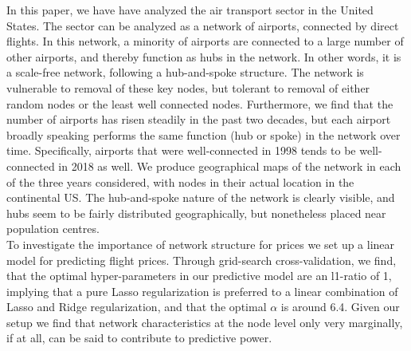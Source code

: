 \label{sec:conclusion}
In this paper, we have have analyzed the air transport sector in the United States. The sector can be analyzed as a network of airports, connected by direct flights. In this network, a minority of airports are connected to a large number of other airports, and thereby function as hubs in the network. In other words, it is a scale-free network, following a hub-and-spoke structure. The network is vulnerable to removal of these key nodes, but tolerant to removal of either random nodes or the least well connected nodes. Furthermore, we find that the number of airports has risen steadily in the past two decades, but each airport broadly speaking performs the same function (hub or spoke) in the network over time. Specifically, airports that were well-connected in 1998 tends to be well-connected in 2018 as well. We produce geographical maps of the network in each of the three years considered, with nodes in their actual location in the continental US. The hub-and-spoke nature of the network is clearly visible, and hubs seem to be fairly distributed geographically, but nonetheless placed near population centres.
\medskip\\
To investigate the importance of network structure for prices we set up a linear model for predicting flight prices. Through grid-search cross-validation, we find, that the optimal hyper-parameters in our predictive model are an l1-ratio of 1, implying that a pure Lasso regularization is preferred to a linear combination of Lasso and Ridge regularization, and that the optimal $\alpha$ is around 6.4. %
Given our setup we find that network characteristics at the node level only very marginally, if at all, can be said to contribute to predictive power.